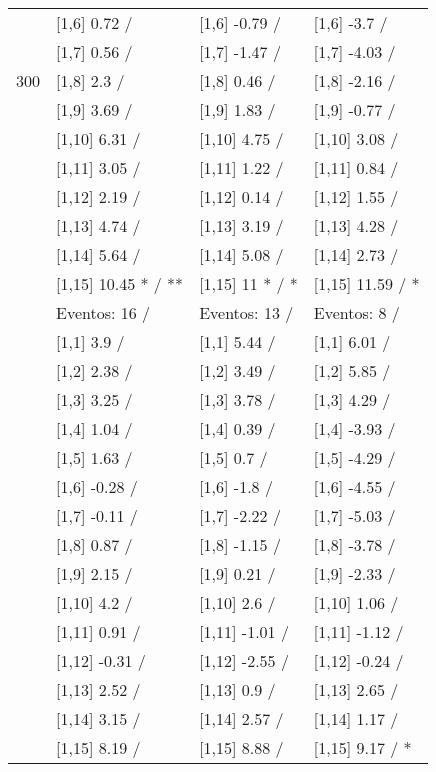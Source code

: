 \begin{table}
\begin{tabular}[t]{llll}
 & {}[1,6] 0.72  / & {}[1,6] -0.79  / & {}[1,6] -3.7  /\\
 & {}[1,7] 0.56  / & {}[1,7] -1.47  / & {}[1,7] -4.03  /\\
300 & {}[1,8] 2.3  / & {}[1,8] 0.46  / & {}[1,8] -2.16  /\\
\addlinespace
 & {}[1,9] 3.69  / & {}[1,9] 1.83  / & {}[1,9] -0.77  /\\
 & {}[1,10] 6.31  / & {}[1,10] 4.75  / & {}[1,10] 3.08  /\\
 & {}[1,11] 3.05  / & {}[1,11] 1.22  / & {}[1,11] 0.84  /\\
 & {}[1,12] 2.19  / & {}[1,12] 0.14  / & {}[1,12] 1.55  /\\
 & {}[1,13] 4.74  / & {}[1,13] 3.19  / & {}[1,13] 4.28  /\\
\addlinespace
 & {}[1,14] 5.64  / & {}[1,14] 5.08  / & {}[1,14] 2.73  /\\
 & {}[1,15] 10.45 * / ** & {}[1,15] 11 * / * & {}[1,15] 11.59  / *\\
 & Eventos:  16 / & Eventos:  13 / & Eventos:  8 /\\
 & {}[1,1] 3.9  / & {}[1,1] 5.44  / & {}[1,1] 6.01  /\\
 & {}[1,2] 2.38  / & {}[1,2] 3.49  / & {}[1,2] 5.85  /\\
\addlinespace
 & {}[1,3] 3.25  / & {}[1,3] 3.78  / & {}[1,3] 4.29  /\\
 & {}[1,4] 1.04  / & {}[1,4] 0.39  / & {}[1,4] -3.93  /\\
 & {}[1,5] 1.63  / & {}[1,5] 0.7  / & {}[1,5] -4.29  /\\
 & {}[1,6] -0.28  / & {}[1,6] -1.8  / & {}[1,6] -4.55  /\\
 & {}[1,7] -0.11  / & {}[1,7] -2.22  / & {}[1,7] -5.03  /\\
\addlinespace
500 & {}[1,8] 0.87  / & {}[1,8] -1.15  / & {}[1,8] -3.78  /\\
 & {}[1,9] 2.15  / & {}[1,9] 0.21  / & {}[1,9] -2.33  /\\
 & {}[1,10] 4.2  / & {}[1,10] 2.6  / & {}[1,10] 1.06  /\\
 & {}[1,11] 0.91  / & {}[1,11] -1.01  / & {}[1,11] -1.12  /\\
 & {}[1,12] -0.31  / & {}[1,12] -2.55  / & {}[1,12] -0.24  /\\
\addlinespace
 & {}[1,13] 2.52  / & {}[1,13] 0.9  / & {}[1,13] 2.65  /\\
 & {}[1,14] 3.15  / & {}[1,14] 2.57  / & {}[1,14] 1.17  /\\
 & {}[1,15] 8.19  / & {}[1,15] 8.88  / & {}[1,15] 9.17  / *\\
\bottomrule
\end{tabular}
\end{table}
